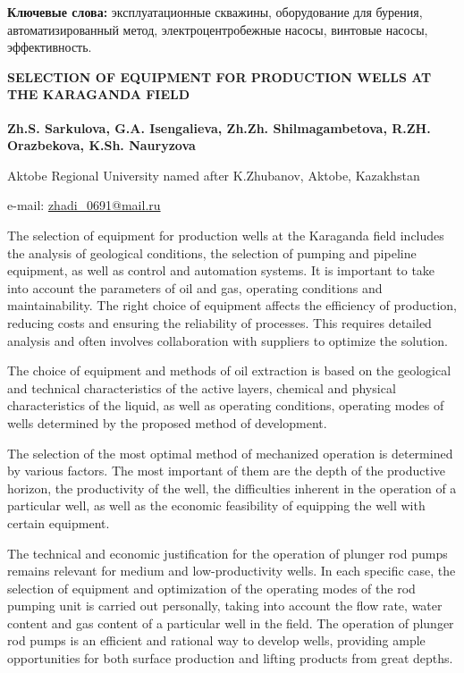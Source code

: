{\bfseries Ключевые слова:} эксплуатационные скважины, оборудование для
бурения, автоматизированный метод, электроцентробежные насосы, винтовые
насосы, эффективность.

\begin{articleheader}
{\bfseries SELECTION OF EQUIPMENT FOR PRODUCTION WELLS AT THE KARAGANDA FIELD}

{\bfseries
Zh.S. Sarkulova\textsuperscript{\envelope },
G.A. Isengalieva,
Zh.Zh. Shilmagambetova,
R.ZH. Orazbekova,
K.Sh. Nauryzova
}
\end{articleheader}

\begin{affiliation}
Aktobe Regional University named after K.Zhubanov, Aktobe, Kazakhstan

e-mail: \href{mailto:zhadi\_0691@mail.ru}{zhadi\_0691@mail.ru}
\end{affiliation}

The selection of equipment for production wells at the Karaganda field
includes the analysis of geological conditions, the selection of pumping
and pipeline equipment, as well as control and automation systems. It is
important to take into account the parameters of oil and gas, operating
conditions and maintainability. The right choice of equipment affects
the efficiency of production, reducing costs and ensuring the
reliability of processes. This requires detailed analysis and often
involves collaboration with suppliers to optimize the solution.

The choice of equipment and methods of oil extraction is based on the
geological and technical characteristics of the active layers, chemical
and physical characteristics of the liquid, as well as operating
conditions, operating modes of wells determined by the proposed method
of development.

The selection of the most optimal method of mechanized operation is
determined by various factors. The most important of them are the depth
of the productive horizon, the productivity of the well, the
difficulties inherent in the operation of a particular well, as well as
the economic feasibility of equipping the well with certain equipment.

The technical and economic justification for the operation of plunger
rod pumps remains relevant for medium and low-productivity wells. In
each specific case, the selection of equipment and optimization of the
operating modes of the rod pumping unit is carried out personally,
taking into account the flow rate, water content and gas content of a
particular well in the field. The operation of plunger rod pumps is an
efficient and rational way to develop wells, providing ample
opportunities for both surface production and lifting products from
great depths.


